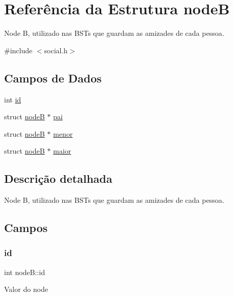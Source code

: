 \hypertarget{structnodeB}{}\section{Referência da Estrutura nodeB}
\label{structnodeB}


Node B, utilizado nas B\+S\+Ts que guardam as amizades de cada pessoa.  




{\ttfamily \#include $<$social.\+h$>$}

\subsection*{Campos de Dados}
\begin{DoxyCompactItemize}
\item 
int \mbox{\hyperlink{structnodeB_ae92bbf4fb34b58f7513991ae67c910c1}{id}}
\item 
struct \mbox{\hyperlink{structnodeB}{nodeB}} $\ast$ \mbox{\hyperlink{structnodeB_a8b1942214da0ec30a911d3d8f1b2f142}{pai}}
\item 
struct \mbox{\hyperlink{structnodeB}{nodeB}} $\ast$ \mbox{\hyperlink{structnodeB_a433b5c01c13cba63ca218f887ce3fef7}{menor}}
\item 
struct \mbox{\hyperlink{structnodeB}{nodeB}} $\ast$ \mbox{\hyperlink{structnodeB_a8c430943b45eba8b8ddb4007b0ed4d2c}{maior}}
\end{DoxyCompactItemize}


\subsection{Descrição detalhada}
Node B, utilizado nas B\+S\+Ts que guardam as amizades de cada pessoa. 

\subsection{Campos}
\mbox{\label{structnodeB_ae92bbf4fb34b58f7513991ae67c910c1}} 
\subsubsection{\texorpdfstring{id}{id}}
{\footnotesize\ttfamily int node\+B\+::id}

Valor do node \mbox{\label{structnodeB_a8b1942214da0ec30a911d3d8f1b2f142}} 
